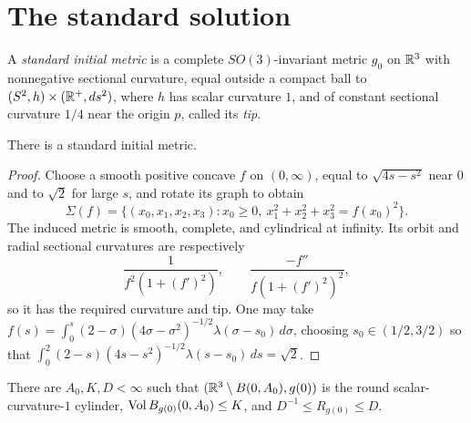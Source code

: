 \chapter{The standard solution}
\label{chap:standard-solution}
\label{stdsolnsect}

\begin{definition}
\label{def:standard-initial-metric}
\label{defn:stinmetr}

A \emph{standard initial metric} is a complete $SO(3)$-invariant metric
$g_0$ on $\mathbb{R}^3$ with nonnegative sectional curvature, equal outside a
compact ball to $(S^2,h)\times(\mathbb{R}^+,ds^2)$, where $h$ has scalar
curvature $1$, and of constant sectional curvature $1/4$ near the origin
$p$, called its \emph{tip}.
\end{definition}

\begin{lemma}
\label{lem:existence-standard-initial-metric}
\label{stdinit}

There is a standard initial metric.
\end{lemma}
\begin{proof}
\sketch Choose a smooth positive concave $f$ on $(0,\infty)$, equal to
$\sqrt{4s-s^2}$ near $0$ and to $\sqrt2$ for large $s$, and rotate its
graph to obtain
\[
 \Sigma(f)=\{(x_0,x_1,x_2,x_3):x_0\ge0,\ x_1^2+x_2^2+x_3^2=f(x_0)^2\}.
\]
The induced metric is smooth, complete, and cylindrical at infinity. Its
orbit and radial sectional curvatures are respectively
\[
 \frac1{f^2(1+(f')^2)},\qquad\frac{-f''}{f(1+(f')^2)^2},
\]
so it has the required curvature and tip. One may take
$f(s)=\int_0^s(2-\sigma)(4\sigma-\sigma^2)^{-1/2}
\lambda(\sigma-s_0)\,d\sigma$, choosing $s_0\in(1/2,3/2)$ so that
$\int_0^2(2-s)(4s-s^2)^{-1/2}\lambda(s-s_0)\,ds=\sqrt2$.
\end{proof}

\begin{lemma}
\label{lem:standard-initial-metric-asymptotic-bounds}
\label{A_0}

There are $A_0,K,D<\infty$ such that $(\mathbb{R}^3\setminus B(0,A_0),g(0))$
is the round scalar-curvature-$1$ cylinder, $\operatorname{Vol} B_{g(0)}(0,A_0)\le K$,
and $D^{-1}\le R_{g(0)}\le D$.
\end{lemma}

